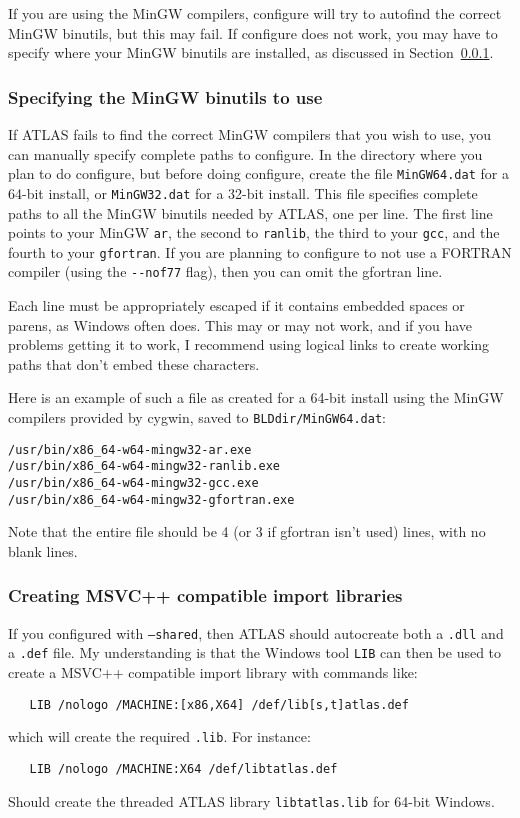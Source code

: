 \documentclass[11pt]{article}
\begin{document}
If you are using the MinGW compilers, configure will try to autofind the
correct MinGW binutils, but this may fail.  If configure does not work,
you may have to specify where your MinGW binutils are installed, as discussed
in Section~\ref{sec-MinGWbin}.


\subsubsection{Specifying the MinGW binutils to use}
\label{sec-MinGWbin}
If ATLAS fails to find the correct MinGW compilers that you wish to use,
you can manually specify complete paths to configure.  In the directory
where you plan to do configure, but before doing configure, create the
file \verb+MinGW64.dat+ for a 64-bit install, or \verb+MinGW32.dat+ for
a 32-bit install.  This file specifies complete paths to all the MinGW
binutils needed by ATLAS, one per line.  The first line points to
your MinGW \verb+ar+, the second to \verb+ranlib+, the third to your \verb+gcc+,
and the fourth to your \verb+gfortran+.  If you are planning to configure
to not use a FORTRAN compiler (using the \verb+--nof77+ flag), then
you can omit the gfortran line.

Each line must be appropriately escaped if it contains embedded spaces or
parens, as Windows often does.  This may or may not work, and if you have
problems getting it to work, I recommend using logical links to create
working paths that don't embed these characters.

Here is an example of such a file as created for a 64-bit install using the
MinGW compilers provided by cygwin, saved to \verb+BLDdir/MinGW64.dat+:
\begin{verbatim}
/usr/bin/x86_64-w64-mingw32-ar.exe
/usr/bin/x86_64-w64-mingw32-ranlib.exe
/usr/bin/x86_64-w64-mingw32-gcc.exe
/usr/bin/x86_64-w64-mingw32-gfortran.exe
\end{verbatim}
Note that the entire file should be 4 (or 3 if gfortran isn't used) lines, 
with no blank lines.

\subsubsection{Creating MSVC++ compatible import libraries}
If you configured with \texttt{--shared}, then ATLAS should autocreate
both a \texttt{.dll} and a \texttt{.def} file.  My understanding is that
the Windows tool \texttt{LIB} can then be used to create a MSVC++ compatible
import library with commands like:
\begin{verbatim}
   LIB /nologo /MACHINE:[x86,X64] /def/lib[s,t]atlas.def
\end{verbatim}
which will create the required \texttt{.lib}.  For instance:
\begin{verbatim}
   LIB /nologo /MACHINE:X64 /def/libtatlas.def
\end{verbatim}
Should create the threaded ATLAS library \texttt{libtatlas.lib} for 64-bit
Windows.
\end{document}
